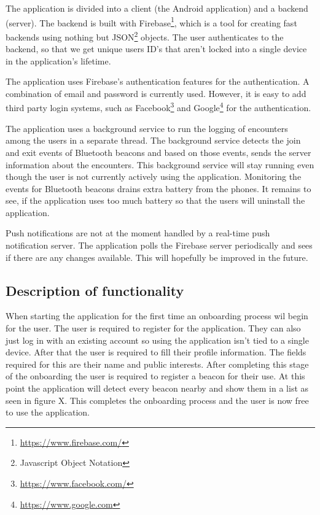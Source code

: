 The application is divided into a client (the Android application) and a backend (server). The backend is built with Firebase\footnote{\url{https://www.firebase.com/}}, which is a tool for creating fast backends using nothing but JSON\footnote{Javascript Object Notation} objects. The user authenticates to the backend, so that we get unique users ID's that aren't locked into a single device in the application's lifetime.

The application uses Firebase's authentication features for the authentication. A combination of email and password is currently used. However, it is easy to add third party login systems, such as Facebook\footnote{\url{https://www.facebook.com/}} and Google\footnote{\url{https://www.google.com}} for the authentication.

The application uses a background service to run the logging of encounters among the users in a separate thread. The background service detects the join and exit events of Bluetooth beacons and based on those events, sends the server information about the encounters. This background service will stay running even though the user is not currently actively using the application. Monitoring the events for Bluetooth beacons drains extra battery from the phones. It remains to see, if the application uses too much battery so that the users will uninstall the application.

Push notifications are not at the moment handled by a real-time push notification server. The application polls the Firebase server periodically and sees if there are any changes available. This will hopefully be improved in the future.

\subsection{Description of functionality}

When starting the application for the first time an onboarding process wil begin for the user. The user is required to register for the application. They can also just log in with an existing account so using the application isn't tied to a single device. After that the user is required to fill their profile information. The fields required for this are their name and public interests. After completing this stage of the onboarding the user is required to register a beacon for their use. At this point the application will detect every beacon nearby and show them in a list as seen in figure X. This completes the onboarding process and the user is now free to use the application.

